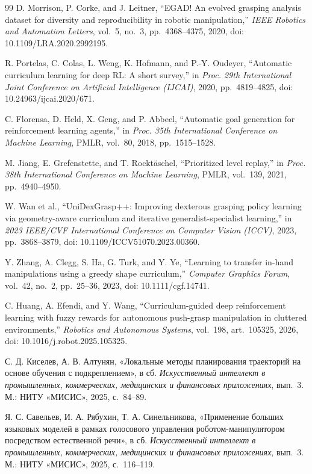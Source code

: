 \documentclass{misisarticle}
\begin{document}
\begin{thebibliography}{99}
 D. Morrison, P. Corke, and J. Leitner, “EGAD! An evolved grasping analysis dataset for diversity and reproducibility in robotic manipulation,” \textit{IEEE Robotics and Automation Letters}, vol.~5, no.~3, pp.~4368--4375, 2020, doi: 10.1109/LRA.2020.2992195.

 R. Portelas, C. Colas, L. Weng, K. Hofmann, and P.-Y. Oudeyer, “Automatic curriculum learning for deep RL: A short survey,” in \textit{Proc. 29th International Joint Conference on Artificial Intelligence (IJCAI)}, 2020, pp.~4819--4825, doi: 10.24963/ijcai.2020/671.

 C. Florensa, D. Held, X. Geng, and P. Abbeel, “Automatic goal generation for reinforcement learning agents,” in \textit{Proc. 35th International Conference on Machine Learning}, PMLR, vol.~80, 2018, pp.~1515--1528.

 M. Jiang, E. Grefenstette, and T. Rocktäschel, “Prioritized level replay,” in \textit{Proc. 38th International Conference on Machine Learning}, PMLR, vol.~139, 2021, pp.~4940--4950.

 W. Wan et al., “UniDexGrasp++: Improving dexterous grasping policy learning via geometry-aware curriculum and iterative generalist-specialist learning,” in \textit{2023 IEEE/CVF International Conference on Computer Vision (ICCV)}, 2023, pp.~3868--3879, doi: 10.1109/ICCV51070.2023.00360.

 Y. Zhang, A. Clegg, S. Ha, G. Turk, and Y. Ye, “Learning to transfer in-hand manipulations using a greedy shape curriculum,” \textit{Computer Graphics Forum}, vol.~42, no.~2, pp.~25--36, 2023, doi: 10.1111/cgf.14741.

 C. Huang, A. Efendi, and Y. Wang, “Curriculum-guided deep reinforcement learning with fuzzy rewards for autonomous push-grasp manipulation in cluttered environments,” \textit{Robotics and Autonomous Systems}, vol.~198, art.~105325, 2026, doi: 10.1016/j.robot.2025.105325.

 С. Д. Киселев, А. В. Алтунян, «Локальные методы планирования траекторий на основе обучения с подкреплением», в сб. \textit{Искусственный интеллект в промышленных, коммерческих, медицинских и финансовых приложениях}, вып.~3. М.: НИТУ «МИСИС», 2025, с.~84--89.

 Я. С. Савельев, И. А. Рябухин, Т. А. Синельникова, «Применение больших языковых моделей в рамках голосового управления роботом-манипулятором посредством естественной речи», в сб. \textit{Искусственный интеллект в промышленных, коммерческих, медицинских и финансовых приложениях}, вып.~3. М.: НИТУ «МИСИС», 2025, с.~116--119.


\end{thebibliography}
\end{document}
